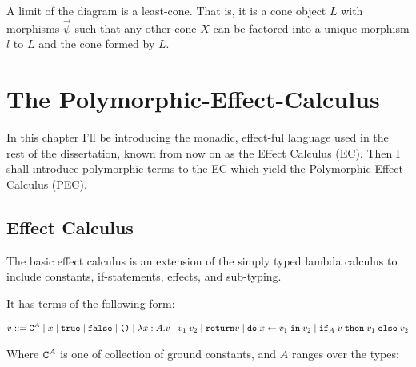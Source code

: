 \documentclass{Report}
\begin{document}

A limit of the diagram is a least-cone. That is, it is a cone object $L$ with morphisms $\vec{\psi}$ such that any other cone $X$ can be factored into a unique morphism $l$ to $L$ and the cone formed by $L$.


\chapter{The Polymorphic-Effect-Calculus}
In this chapter I'll be introducing the monadic, effect-ful language used in the rest of the dissertation, known from now on as the Effect Calculus (EC). Then I shall introduce polymorphic terms to the EC which yield the Polymorphic Effect Calculus (PEC).

\section{Effect Calculus}
The basic effect calculus is an extension of the simply typed lambda calculus to include constants, if-statements, effects, and sub-typing.

It has terms of the following form:

\begin{align}
    v ::= \texttt{C}^{A} \mid x\mid \texttt{true} \mid\texttt{false} \mid\texttt{()}\mid\lambda x : A. v\mid v_1\; v_2\mid\texttt{return} v\mid\texttt{do}\; x \leftarrow v_1 \;\texttt{in}\; v_2\mid\texttt{if}_{A}\; v\; \texttt{then}\; v_1 \;\texttt{else} \; v_2 
\end{align}

Where $\texttt{C}^{A}$ is one of collection of ground constants, and $A$ ranges over the types:
\end{document}
